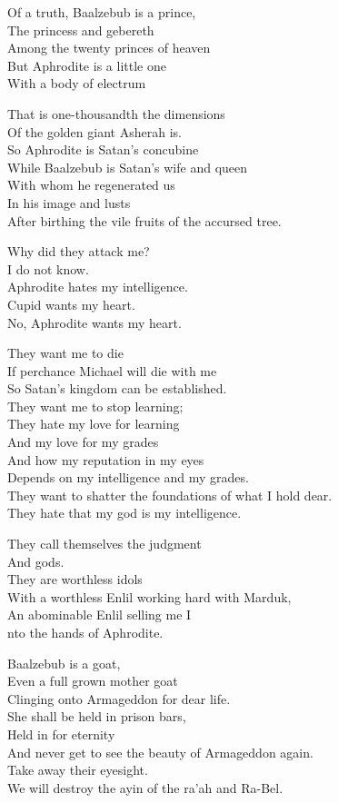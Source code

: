 \documentclass[
]{book}
\begin{document}
Of a truth, Baalzebub is a prince,\\
The princess and gebereth\\
Among the twenty princes of heaven\\
But Aphrodite is a little one\\
With a body of electrum

That is one-thousandth the dimensions\\
Of the golden giant Asherah is.\\
So Aphrodite is Satan's concubine\\
While Baalzebub is Satan's wife and queen\\
With whom he regenerated us\\
In his image and lusts\\
After birthing the vile fruits of the accursed tree.

Why did they attack me?\\
I do not know.\\
Aphrodite hates my intelligence.\\
Cupid wants my heart.\\
No, Aphrodite wants my heart.

They want me to die\\
If perchance Michael will die with me\\
So Satan's kingdom can be established.\\
They want me to stop learning;\\
They hate my love for learning\\
And my love for my grades\\
And how my reputation in my eyes\\
Depends on my intelligence and my grades.\\
They want to shatter the foundations of what I hold dear.\\
They hate that my god is my intelligence.

They call themselves the judgment\\
And gods.\\
They are worthless idols\\
With a worthless Enlil working hard with Marduk,\\
An abominable Enlil selling me I\\
nto the hands of Aphrodite.

Baalzebub is a goat,\\
Even a full grown mother goat\\
Clinging onto Armageddon for dear life.\\
She shall be held in prison bars,\\
Held in for eternity\\
And never get to see the beauty of Armageddon again.\\
Take away their eyesight.\\
We will destroy the ayin of the ra'ah and Ra-Bel.
\end{document}
